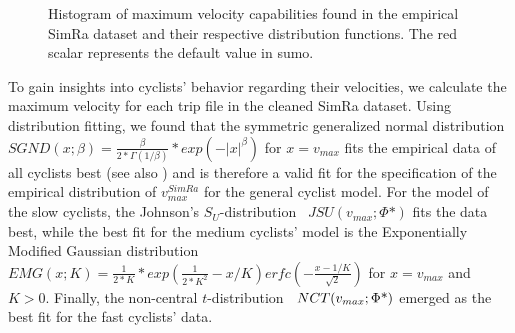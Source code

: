 \begin{figure}
    \centering
    \hfill
    \caption{%
        Histogram of maximum velocity capabilities found in the empirical SimRa dataset and their respective distribution functions.
        The red scalar represents the default value in \ac{sumo}.
    }%
    \label{fig:analysis_max_velo_dist_fit}
    \vspace{-.5em}
\end{figure}

To gain insights into cyclists' behavior regarding their velocities, we calculate the maximum velocity for each trip file in the cleaned SimRa dataset.
Using distribution fitting, we found that the symmetric generalized normal distribution~\cite{nadarajah2005generalized} $SGND(x;\beta) = \frac{\beta}{2*\Gamma(1/\beta)}*exp(-|x|^\beta)$ for $x=v_{max}$ fits the empirical data of all cyclists best (see also ) and is therefore a valid fit for the specification of the empirical distribution of $v_{max}^{SimRa}$ for the general cyclist model.
For the model of the slow cyclists, the Johnson's $S_{U}$-distribution~\cite{johnson1949systems} $JSU(v_{max}; \Phi\mbox{*})$ fits the data best, while the best fit for the medium cyclists' model is the Exponentially Modified Gaussian distribution~\cite{grushka1972characterization} $EMG(x; K) = \frac{1}{2*K}*exp(\frac{1}{2*K^2}-x/K)erfc(-\frac{x-1/K}{\sqrt{2}})$ for $x = v_{max}$ and $K>0$.
Finally, the non-central $t$-distribution~\cite{hogben1961moments} $NCT\newline(v_{max}; \Phi\mbox{*})$ emerged as the best fit for the fast cyclists' data.

